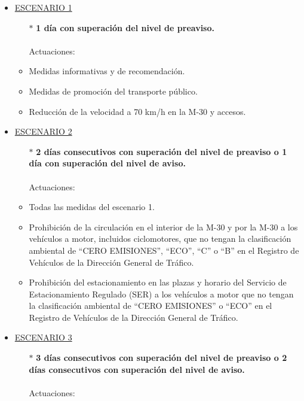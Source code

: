 \begin{itemize}
	\item \underline{ESCENARIO 1}
		\begin{itemize}
			\item[$\ast$] \textbf{1 día con superación del nivel de preaviso. }
			\\ \\
			Actuaciones:
		\end{itemize}
		\begin{itemize}
				\item Medidas informativas y de recomendación.
				\item Medidas de promoción del transporte público.
				\item Reducción de la velocidad a 70 km/h en la M-30 y accesos.
		\end{itemize}
	\item \underline{ESCENARIO 2}
		\begin{itemize}
			\item[$\ast$] \textbf{2 días consecutivos con superación del nivel de preaviso o 1 día con superación del nivel de aviso. }
			\\ \\
			Actuaciones:
		\end{itemize}
		\begin{itemize}
			\item Todas las medidas del escenario 1.
			\item Prohibición de la circulación en el interior de la M-30 y por la M-30 a los vehículos a motor, incluidos ciclomotores, que no tengan la clasificación ambiental de “CERO EMISIONES”, “ECO”, “C” o “B” en el Registro de Vehículos de la Dirección General de Tráfico. 
			\item Prohibición del estacionamiento en las plazas y horario del Servicio de Estacionamiento Regulado (SER) a los vehículos a motor que no tengan la clasificación ambiental de “CERO EMISIONES” o “ECO” en el Registro de Vehículos de la Dirección General de Tráfico. 
		\end{itemize}
	\item \underline{ESCENARIO 3}
		\begin{itemize}
			\item[$\ast$] \textbf{3 días consecutivos con superación del nivel de preaviso o 2 días consecutivos con superación del nivel de aviso. }
			\\ \\
			Actuaciones:
		\end{itemize}

\end{itemize}
